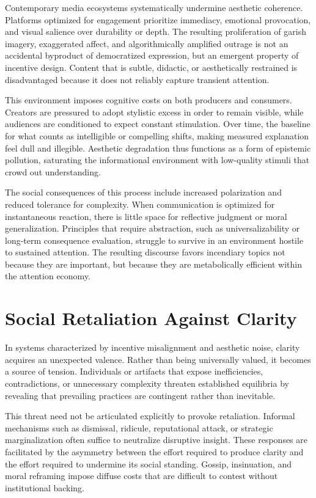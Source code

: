 \documentclass[12pt]{article}
\begin{document}
Contemporary media ecosystems systematically undermine aesthetic coherence. Platforms optimized for engagement prioritize immediacy, emotional provocation, and visual salience over durability or depth. The resulting proliferation of garish imagery, exaggerated affect, and algorithmically amplified outrage is not an accidental byproduct of democratized expression, but an emergent property of incentive design. Content that is subtle, didactic, or aesthetically restrained is disadvantaged because it does not reliably capture transient attention.

This environment imposes cognitive costs on both producers and consumers. Creators are pressured to adopt stylistic excess in order to remain visible, while audiences are conditioned to expect constant stimulation. Over time, the baseline for what counts as intelligible or compelling shifts, making measured explanation feel dull and illegible. Aesthetic degradation thus functions as a form of epistemic pollution, saturating the informational environment with low-quality stimuli that crowd out understanding.

The social consequences of this process include increased polarization and reduced tolerance for complexity. When communication is optimized for instantaneous reaction, there is little space for reflective judgment or moral generalization. Principles that require abstraction, such as universalizability or long-term consequence evaluation, struggle to survive in an environment hostile to sustained attention. The resulting discourse favors incendiary topics not because they are important, but because they are metabolically efficient within the attention economy.

\section{Social Retaliation Against Clarity}

In systems characterized by incentive misalignment and aesthetic noise, clarity acquires an unexpected valence. Rather than being universally valued, it becomes a source of tension. Individuals or artifacts that expose inefficiencies, contradictions, or unnecessary complexity threaten established equilibria by revealing that prevailing practices are contingent rather than inevitable.

This threat need not be articulated explicitly to provoke retaliation. Informal mechanisms such as dismissal, ridicule, reputational attack, or strategic marginalization often suffice to neutralize disruptive insight. These responses are facilitated by the asymmetry between the effort required to produce clarity and the effort required to undermine its social standing. Gossip, insinuation, and moral reframing impose diffuse costs that are difficult to contest without institutional backing.
\end{document}
